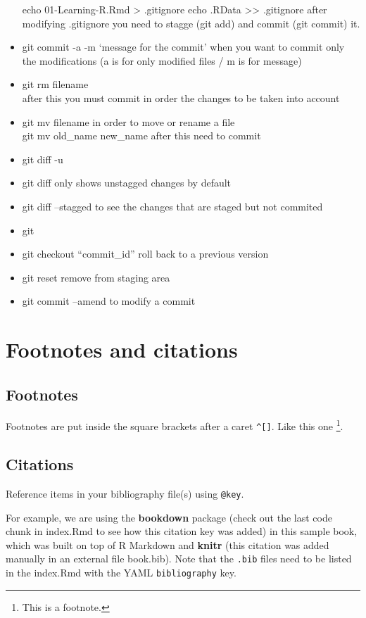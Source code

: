 \documentclass[
]{book}
\begin{document}
\begin{itemize}
  echo 01-Learning-R.Rmd \textgreater{} .gitignore
  echo .RData \textgreater\textgreater{} .gitignore
  after modifying .gitignore you need to stagge (git add) and commit (git commit) it.
\item
  git commit -a -m `message for the commit'
  when you want to commit only the modifications
  (a is for only modified files / m is for message)
\item
  git rm filename\\
  after this you must commit in order the changes to be taken into account
\item
  git mv filename in order to move or rename a file\\
  git mv old\_name new\_name
  after this need to commit
\item
  git diff -u
\item
  git diff only shows unstagged changes by default
\item
  git diff --stagged to see the changes that are staged but not commited
\item
  git
\item
  git checkout ``commit\_id''
  roll back to a previous version
\item
  git reset
  remove from staging area
\item
  git commit --amend
  to modify a commit
\end{itemize}

\hypertarget{footnotes-and-citations}{%
\chapter{Footnotes and citations}\label{footnotes-and-citations}}

\hypertarget{footnotes}{%
\section{Footnotes}\label{footnotes}}

Footnotes are put inside the square brackets after a caret \texttt{\^{}{[}{]}}. Like this one \footnote{This is a footnote.}.

\hypertarget{citations}{%
\section{Citations}\label{citations}}

Reference items in your bibliography file(s) using \texttt{@key}.

For example, we are using the \textbf{bookdown} package \citep{R-bookdown} (check out the last code chunk in index.Rmd to see how this citation key was added) in this sample book, which was built on top of R Markdown and \textbf{knitr} \citep{xie2015} (this citation was added manually in an external file book.bib).
Note that the \texttt{.bib} files need to be listed in the index.Rmd with the YAML \texttt{bibliography} key.
\end{document}
